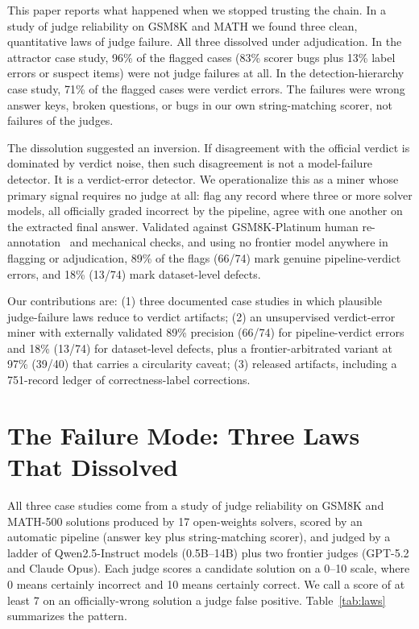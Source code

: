 \documentclass[11pt]{article}
\begin{document}
This paper reports what happened when we stopped trusting the chain.
In a study of judge reliability on GSM8K and MATH we found three clean, quantitative laws of judge failure.
All three dissolved under adjudication.
In the attractor case study, 96\% of the flagged cases (83\% scorer bugs plus 13\% label errors or suspect items) were not judge failures at all.
In the detection-hierarchy case study, 71\% of the flagged cases were verdict errors.
The failures were wrong answer keys, broken questions, or bugs in our own string-matching scorer, not failures of the judges.

The dissolution suggested an inversion.
If disagreement with the official verdict is dominated by verdict noise, then such disagreement is not a model-failure detector.
It is a verdict-error detector.
We operationalize this as a miner whose primary signal requires no judge at all: flag any record where three or more solver models, all officially graded incorrect by the pipeline, agree with one another on the extracted final answer.
Validated against GSM8K-Platinum human re-annotation~\cite{platinum} and mechanical checks, and using no frontier model anywhere in flagging or adjudication, 89\% of the flags (66/74) mark genuine pipeline-verdict errors, and 18\% (13/74) mark dataset-level defects.

Our contributions are:
(1) three documented case studies in which plausible judge-failure laws reduce to verdict artifacts;
(2) an unsupervised verdict-error miner with externally validated 89\% precision (66/74) for pipeline-verdict errors and 18\% (13/74) for dataset-level defects, plus a frontier-arbitrated variant at 97\% (39/40) that carries a circularity caveat;
(3) released artifacts, including a 751-record ledger of correctness-label corrections.

\section{The Failure Mode: Three Laws That Dissolved}
\label{sec:laws}

All three case studies come from a study of judge reliability on GSM8K and MATH-500 solutions produced by 17 open-weights solvers, scored by an automatic pipeline (answer key plus string-matching scorer), and judged by a ladder of Qwen2.5-Instruct models (0.5B--14B) plus two frontier judges (GPT-5.2 and Claude Opus).
Each judge scores a candidate solution on a 0--10 scale, where 0 means certainly incorrect and 10 means certainly correct.
We call a score of at least 7 on an officially-wrong solution a judge false positive.
Table~\ref{tab:laws} summarizes the pattern.
\end{document}
